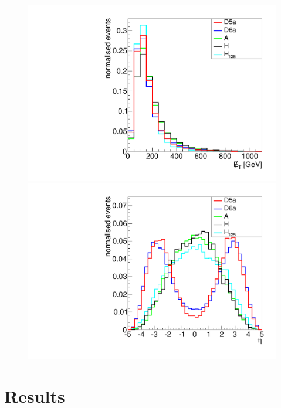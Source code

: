 \begin{figure}
  \includegraphics[width=.65\largefigwidth]{plots/interp/modelmet.pdf}
  \includegraphics[width=.65\largefigwidth]{plots/interp/modeleta.pdf}
  \caption{}%
  \label{fig:dmmodelkinematics}
\end{figure}

\section{Results}
\label{sec:dmresults}


